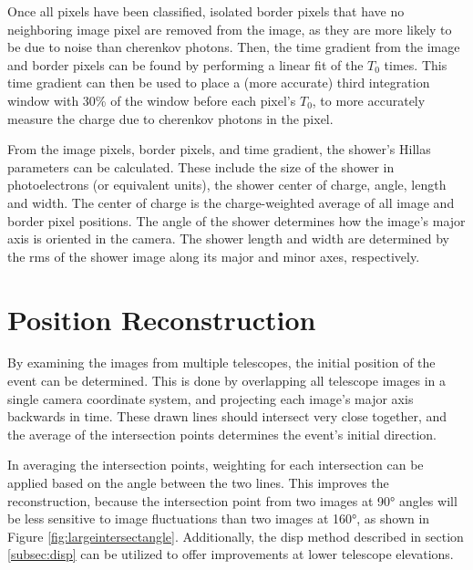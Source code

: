   Once all pixels have been classified, isolated border pixels that have no neighboring image pixel are removed from the image, as they are more likely to be due to noise than cherenkov photons.
  Then, the time gradient from the image and border pixels can be found by performing a linear fit of the $T_{0}$ times.
  This time gradient can then be used to place a (more accurate) third integration window with 30\% of the window before each pixel's $T_{0}$, to more accurately measure the charge due to cherenkov photons in the pixel.

  From the image pixels, border pixels, and time gradient, the shower's Hillas parameters \cite{hillas_params} can be calculated.
  These include the size of the shower in photoelectrons (or equivalent units), the shower center of charge, angle, length and width.
  The center of charge is the charge-weighted average of all image and border pixel positions.
  The angle of the shower determines how the image's major axis is oriented in the camera.
  The shower length and width are determined by the rms of the shower image along its major and minor axes, respectively.

\section{Position Reconstruction}\label{subsec:posrecon}
  By examining the images from multiple telescopes, the initial position of the event can be determined.
  This is done by overlapping all telescope images in a single camera coordinate system, and projecting each image's major axis backwards in time.
  These drawn lines should intersect very close together, and the average of the intersection points determines the event's initial direction.

  In averaging the intersection points, weighting for each intersection can be applied based on the angle between the two lines.
  This improves the reconstruction, because the intersection point from two images at \ang{90} angles will be less sensitive to image fluctuations than two images at \ang{160}, as shown in Figure \ref{fig:largeintersectangle}.
  Additionally, the disp method described in section \ref{subsec:disp} can be utilized to offer improvements at lower telescope elevations.

